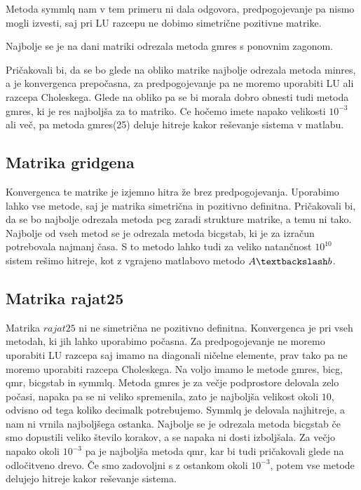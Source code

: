 \documentclass[11pt]{article} %
\begin{document}
Metoda symmlq nam v tem primeru ni dala odgovora, predpogojevanje pa nismo mogli izvesti, saj pri LU razcepu ne dobimo simetrične pozitivne matrike.

Najbolje se je na dani matriki odrezala metoda gmres s ponovnim zagonom.

Pričakovali bi, da se bo glede na obliko matrike najbolje odrezala metoda minres, a je konvergenca prepočasna, za predpogojevanje pa ne moremo uporabiti LU ali razcepa Choleskega. Glede na obliko pa se bi morala dobro obnesti tudi metoda gmres, ki je res najboljša za to matriko. Ce hočemo imete napako velikosti $10^{-3}$ ali več, pa metoda gmres(25) deluje hitreje kakor reševanje sistema v matlabu.

\subsection{Matrika gridgena}

Konvergenca te matrike je izjemno hitra že brez predpogojevanja. Uporabimo lahko vse metode, saj je matrika simetrična in pozitivno definitna. Pričakovali bi, da se bo najbolje odrezala metoda pcg zaradi strukture matrike, a temu ni tako. Najbolje od vseh metod se je odrezala metoda bicgstab, ki je za izračun potrebovala najmanj časa. S to metodo lahko tudi za veliko natančnost $10^{10}$ sistem rešimo hitreje, kot z vgrajeno matlabovo metodo $A\textbackslash b$.

\subsection{Matrika rajat25}

Matrika $rajat25$ ni ne simetrična ne pozitivno definitna. Konvergenca je pri vseh metodah, ki jih lahko uporabimo počasna. Za predpogojevanje ne moremo uporabiti LU razcepa saj imamo na diagonali ničelne elemente, prav tako pa ne moremo uporabiti razcepa Choleskega. Na voljo imamo le metode gmres, bicg, qmr, bicgstab in symmlq. Metoda gmres je za večje podprostore delovala zelo počasi, napaka pa se ni veliko spremenila, zato je najboljša velikost okoli $10$, odvisno od tega koliko decimalk potrebujemo. Symmlq je delovala najhitreje, a nam ni vrnila najboljšega ostanka. Najbolje se je odrezala metoda bicgstab če smo dopustili veliko število korakov, a se napaka ni dosti izboljšala. Za večjo napako okoli $10^{-3}$ pa je najboljša metoda qmr, kar bi tudi pričakovali glede na odločitveno drevo. Če smo zadovoljni s z ostankom okoli $10^{-3}$, potem vse metode delujejo hitreje kakor reševanje sistema.
\end{document}
